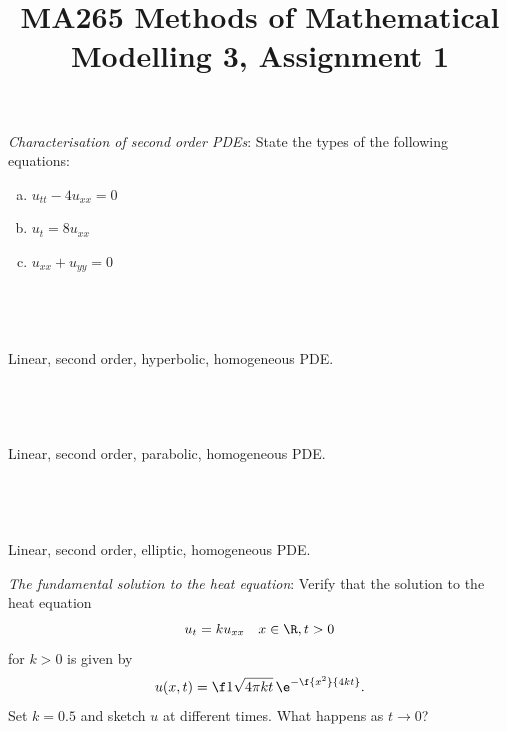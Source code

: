 \documentclass[a4paper]{article}
\title{MA265 Methods of Mathematical Modelling 3, Assignment 1}
\begin{document}
\maketitle

\setlength{\parindent}{0em}
\setlength{\parskip}{1em}


\begin{questionbody}
\textit{Characterisation of second order PDEs}: State the types of the following equations:
\begin{enumerate}[(a)]
\item $u_{tt} - 4 u_{xx} = 0$
\item $u_t = 8 u_{xx}$
\item $u_{xx} + u_{yy} = 0$
\end{enumerate}
\end{questionbody}


\subsection{~} %

Linear, second order, hyperbolic, homogeneous PDE\@.

\subsection{~} %

Linear, second order, parabolic, homogeneous PDE\@.

\subsection{~} %

Linear, second order, elliptic, homogeneous PDE\@.



\begin{questionbody}
\textit{The fundamental solution to the heat equation}: Verify that the solution to the heat equation \begin{equation}
u_t = k u_{xx} \quad x \in \R, t > 0
\label{eqn:heat-equation}
\end{equation}
for $k > 0$ is given by \[
u(x, t) = \f1{\sqrt{4 \pi kt}} \, \e^{-\f{x^2}{4 kt}}.
\] Set $k = 0.5$ and sketch $u$ at different times. What happens as $t \to 0$?
\end{questionbody}
\end{document}
